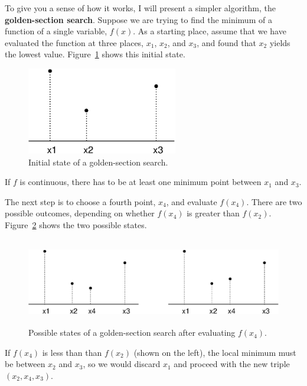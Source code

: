 \documentclass[
]{book}
\numberwithin{Answer}{chapter}
\numberwithin{Exercise}{chapter}
\begin{document}

To give you a sense of how it works, I will present a simpler algorithm, the {\bf golden-section search}.  Suppose we are trying to find the minimum of a function of a single variable, $f(x)$.  As a starting place, assume that we have evaluated the function at three places, 
$x_1$, $x_2$, and $x_3$, and found that $x_2$ yields the lowest
value. Figure~\ref{fig:golden1} shows this initial state.

\begin{figure}
\centerline{\includegraphics[height=1.5in]{book/figs/golden1.eps}}
\caption{Initial state of a golden-section search.}
\label{fig:golden1}
\end{figure}

If $f$ is continuous, there has to be at least one
minimum point between $x_1$ and $x_3$.


The next step is to choose a fourth point, $x_4$, and evaluate
$f(x_4)$.  There are two possible outcomes, depending on whether
$f(x_4)$ is greater than $f(x_2)$.
Figure~\ref{fig:golden2} shows the two possible states.

\begin{figure}
\centerline{\includegraphics[height=1.5in]{book/figs/golden2.eps}}
\caption{Possible states of a golden-section search after evaluating $f(x_4)$.}
\label{fig:golden2}
\end{figure}

If $f(x_4)$ is less than than $f(x_2)$ (shown on the left), the
local minimum must be between $x_2$ and $x_3$, so we would discard $x_1$ and proceed with the new triple $(x_2, x_4, x_3)$.
\end{document}
